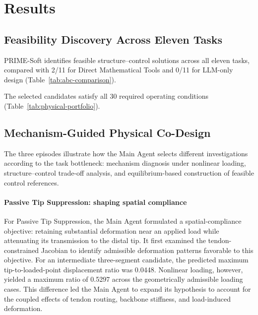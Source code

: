 \section{Results}
\label{sec:results}

\subsection{Feasibility Discovery Across Eleven Tasks}
\label{subsec:portfolio-results}

PRIME-Soft identifies feasible structure--control solutions across all eleven tasks, compared with 2/11 for Direct Mathematical Tools and 0/11 for LLM-only design (Table~\ref{tab:abc-comparison}).



The selected candidates satisfy all 30 required operating conditions (Table~\ref{tab:physical-portfolio}).

\subsection{Mechanism-Guided Physical Co-Design}
\label{subsec:process-dissection}



The three episodes illustrate how the Main Agent selects different investigations according to the task bottleneck: mechanism diagnosis under nonlinear loading, structure--control trade-off analysis, and equilibrium-based construction of feasible control references.

\paragraph{Passive Tip Suppression: shaping spatial compliance}

For Passive Tip Suppression, the Main Agent formulated a spatial-compliance objective: retaining substantial deformation near an applied load while attenuating its transmission to the distal tip. It first examined the tendon-constrained Jacobian to identify admissible deformation patterns favorable to this objective. For an intermediate three-segment candidate, the predicted maximum tip-to-loaded-point displacement ratio was 0.0448. Nonlinear loading, however, yielded a maximum ratio of 0.5297 across the geometrically admissible loading cases. This difference led the Main Agent to expand its hypothesis to account for the coupled effects of tendon routing, backbone stiffness, and load-induced deformation.

